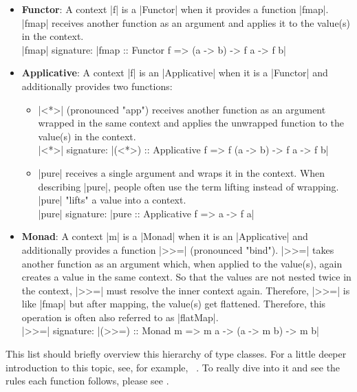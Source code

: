\begin{itemize}
  \item \textbf{Functor}: A context |f| is a |Functor| when it provides a function
|fmap|. |fmap| receives another function as an argument and applies it to the
value(s) in the context.\\
|fmap| signature: |fmap :: Functor f => (a -> b) -> f a -> f b|\\

\item \textbf{Applicative}: A context |f| is an |Applicative| when it is a |Functor|
and additionally provides two functions:
\begin{itemize}
  \item |<*>| (pronounced "app") receives another function as an
    argument wrapped in the same context and applies the unwrapped function to
    the value(s) in the context. \\
    |<*>| signature: |(<*>) :: Applicative f => f (a -> b) -> f a -> f b|
  \item |pure| receives a single argument and wraps it in the context. When
    describing |pure|, people often use the term lifting instead of wrapping.
    |pure| "lifts" a value into a context.\\
    |pure| signature: |pure :: Applicative f => a -> f a| \\
\end{itemize}
\item \textbf{Monad}: A context |m| is a |Monad| when it is an |Applicative|
  and additionally provides a function |>>=| (pronounced "bind"). |>>=| takes
  another function as an argument which, when applied to the value(s), again
  creates a value in the same context. So that the values are not nested twice
  in the context, |>>=| must resolve the inner context again. Therefore, |>>=|
  is like |fmap| but after mapping, the value(s) get flattened. Therefore, this
  operation is often also referred to as |flatMap|.\\
|>>=| signature: |(>>=) :: Monad m => m a -> (a -> m b) -> m b|\\
\end{itemize}

This list should briefly overview this hierarchy of type classes. For a little
deeper introduction to this topic, see, for example, ~\cite{monads_adit_2013}.
To really dive into it and see the rules each function follows, please see
\cite[Ch.~12]{hutton_pih_2016}.

